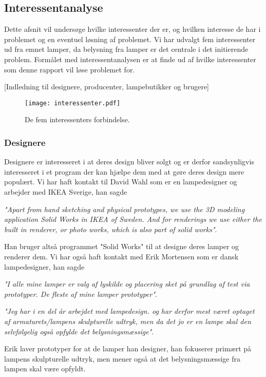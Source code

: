 \subsection{Interessentanalyse}
Dette afsnit vil undersøge hvilke interessenter der er, og hvilken interesse de har i problemet og en eventuel løsning af problemet. Vi har udvalgt fem interessenter ud fra emnet lamper, da belysning fra lamper er det centrale i det initierende problem. Formålet med interessentanalysen er at finde ud af hvilke interessenter som denne rapport vil løse problemet for.

[Indledning til designere, producenter, lampebutikker og brugere]
\begin{figure}[H]
	\texttt{[image: interessenter.pdf]}
	\caption{De fem interessenters forbindelse.}
    \label{fig:interessenter}
\end{figure}

\subsubsection{Designere}
Designere er interesseret i at deres design bliver solgt og er derfor sandsynligvis interesseret i et program der kan hjælpe dem med at gøre deres design mere populært.
Vi har haft kontakt til David Wahl som er en lampedesigner og arbejder med IKEA Sverige, han sagde 
\begin{center}
\textit{"Apart from hand sketching and physical prototypes, we use the 3D modeling application Solid Works in IKEA of Sweden. And for renderings we use either the built in renderer, or photo works, which is also part of solid works"}\cite{sec:mailDavid}.
\end{center}
Han bruger altså programmet "Solid Works"\cite{SolidWorks} til at designe deres lamper og renderer dem.
Vi har også haft kontakt med Erik Mortensen som er dansk lampedesigner, han sagde 
\begin{center}
\textit{"I alle mine lamper er valg af lyskilde og placering sket på grundlag af test via prototyper. De fleste af mine lamper prototyper"}.

\textit{"Jeg har i en del år arbejdet med lampedesign. og har derfor mest været optaget af armaturets/lampens skulpturelle udtryk, men da det jo er en lampe skal den selvfølgelig  også opfylde det belysningsmæssige"}\cite{sec:mailErik}.
\end{center}
 Erik laver prototyper for at de lamper han designer, han fokuserer primært på lampens skulpturelle udtryk, men mener også at det belysningsmæssige fra lampen skal være opfyldt. 

